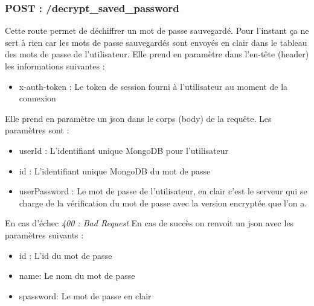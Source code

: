 \documentclass[12pt]{report}
\begin{document}
	\subsubsection{POST : /decrypt\_saved\_password}
	Cette route permet de déchiffrer un mot de passe sauvegardé. Pour l'instant ça ne sert à rien car les mots de passe sauvegardés sont envoyés en clair dans le tableau des mots de passe de l'utilisateur.
	\newline
	Elle prend en paramètre dans l'en-tête (header) les informations suivantes :
	\begin{itemize}
		\item x-auth-token : Le token de session fourni à l'utilisateur au moment de la connexion
	\end{itemize}
	Elle prend en paramètre un \gls{json} dans le corps (body) de la requête. Les paramètres sont :
	\begin{itemize}
		\item userId : L'identifiant unique MongoDB pour l'utilisateur
		\item id : L'identifiant unique MongoDB du mot de passe
		\item userPassword : Le mot de passe de l'utilisateur, en clair c'est le serveur qui se charge de la vérification du mot de passe avec la version encryptée que l'on a.
	\end{itemize}
	En cas d'échec \textit{400 : Bad Request}
	En cas de succès on renvoit un \gls{json} avec les paramètres suivants :
	\begin{itemize}
		\item id : L'id du mot de passe
		\item name: Le nom du mot de passe 
		\item spassword: Le mot de passe en clair
	\end{itemize}
\end{document}
